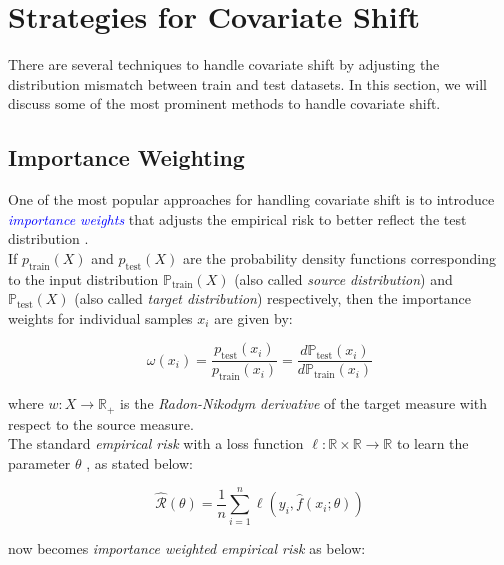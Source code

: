\chapter{Strategies for Covariate Shift}\label{chp:3}

There are several techniques to handle covariate shift by adjusting the distribution mismatch between train and test datasets. In this section, we will discuss some of the most prominent methods to handle covariate shift.

\section{Importance Weighting}\label{imp-weight}

One of the most popular approaches for handling covariate shift is to introduce \textcolor{blue}{\emph{importance weights}} that adjusts the empirical risk to better reflect the test distribution \citep{shimodaira2000improving}.\\

If $p_{\text{train}}(X)$ and $p_{\text{test}}(X)$ are the probability density functions corresponding to the input distribution $\mathbb{P}_{\text{train}}(X)$ (also called \emph{source distribution}) and $\mathbb{P}_{\text{test}}(X)$ (also called \emph{target distribution}) respectively, then the importance weights for individual samples $x_i$ are given by:

\begin{equation}
    \omega(x_i) = \frac{p_{\text{test}}(x_i)}{p_{\text{train}}(x_i)} = \frac{d\mathbb{P}_{\text{test}}(x_i)}{d\mathbb{P}_{\text{train}}(x_i)}
    \label{eqn:3.1}
\end{equation}

where $w: X \to \mathbb{R}_+$ is the \emph{Radon-Nikodym derivative} of the target measure with respect to the source measure.\\

The standard \emph{empirical risk} with a loss function $\ell: \mathbb{R} \times \mathbb{R} \to \mathbb{R}$ to learn the parameter $\theta$ \citep{vapnik1998statistical, scholkopf2002learning}, as stated below:

\begin{equation}
    \hat{\mathcal{R}}(\theta) = \frac{1}{n}\sum_{i=1}^{n}\ell(y_i, \hat{f}(x_i; \theta))
    \label{eqn:3.2}
\end{equation}

now becomes \emph{importance weighted empirical risk} as below:

